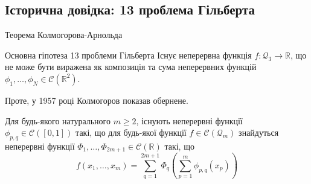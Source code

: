 \documentclass{zkdl-presentation-template}
\begin{document}
    \subsection{Історична довідка: 13 проблема Гільберта}
    
    \begin{frame}{Теорема Колмогорова-Арнольда}
        \begin{block}{Основна гіпотеза 13 проблеми Гільберта}
            Існує неперервна функція $f: \mathcal{Q}_3 \to \mathbb{R}$, що не може бути
            виражена як композиція та сума неперервних функцій $\phi_1,\dots,\phi_N \in
            \mathcal{C}(\mathbb{R}^2)$.
        \end{block}

        Проте, у 1957 році Колмогоров показав обернене.

        \begin{definition}
            Для будь-якого натурального $m \geq 2$, існують неперервні функції
            $\phi_{p,q} \in \mathcal{C}([0,1])$ такі, що для будь-якої функції $f \in
            \mathcal{C}(\mathcal{Q}_m)$ знайдуться неперервні функції
            $\Phi_1,\dots,\Phi_{2m+1} \in \mathcal{C}(\mathbb{R})$ такі, що
            \begin{equation*}
                f(x_1,\dots,x_m) = \sum_{q=1}^{2m+1}\Phi_q\left(\sum_{p=1}^m \phi_{p,q}(x_p)\right)
            \end{equation*}
        \end{definition}
    \end{frame}
\end{document}
